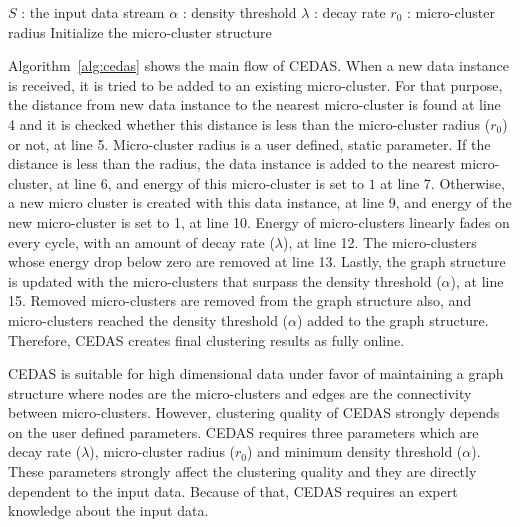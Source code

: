 \documentclass[smallcondensed]{svjour3}     %
\begin{document}
\begin{algorithm}
	\caption{CEDAS (S, $\alpha$, $\lambda$, $r_0$)}
	\label{alg:cedas}
	\begin{algorithmic}[1]
		\Require $S$ : the input data stream
		\Require $\alpha$ : density threshold
		\Require $\lambda$ : decay rate
		\Require $r_0$ : micro-cluster radius
		\State Initialize the micro-cluster structure
		
	\end{algorithmic}
\end{algorithm}

Algorithm~\ref{alg:cedas} shows the main flow of CEDAS. When a new data instance is received, it is tried to be added to an existing micro-cluster. For that purpose, the distance from new data instance to the nearest micro-cluster is found at line 4 and it is checked whether this distance is less than the micro-cluster radius ($r_0$) or not, at line 5. Micro-cluster radius is a user defined, static parameter. If the distance is less than the radius, the data instance is added to the nearest micro-cluster, at line 6, and energy of this micro-cluster is set to $1$ at line 7. Otherwise, a new micro cluster is created with this data instance, at line 9, and energy of the new micro-cluster is set to 1, at line 10. Energy of micro-clusters linearly fades on every cycle, with an amount of decay rate ($\lambda$), at line 12. The micro-clusters whose energy drop below zero are removed at line 13. Lastly, the graph structure is updated with the micro-clusters that surpass the density threshold ($\alpha$), at line 15. Removed micro-clusters are removed from the graph structure also, and micro-clusters reached the density threshold ($\alpha$) added to the graph structure. Therefore, CEDAS creates final clustering results as fully online.

CEDAS is suitable for high dimensional data under favor of maintaining a graph structure where nodes are the micro-clusters and edges are the connectivity between micro-clusters. However, clustering quality of CEDAS strongly depends on the user defined parameters. CEDAS requires three parameters which are decay rate ($\lambda$), micro-cluster radius ($r_0$) and minimum density threshold ($\alpha$). These parameters strongly affect the clustering quality and they are directly dependent to the input data. Because of that, CEDAS requires an expert knowledge about the input data.
\end{document}
